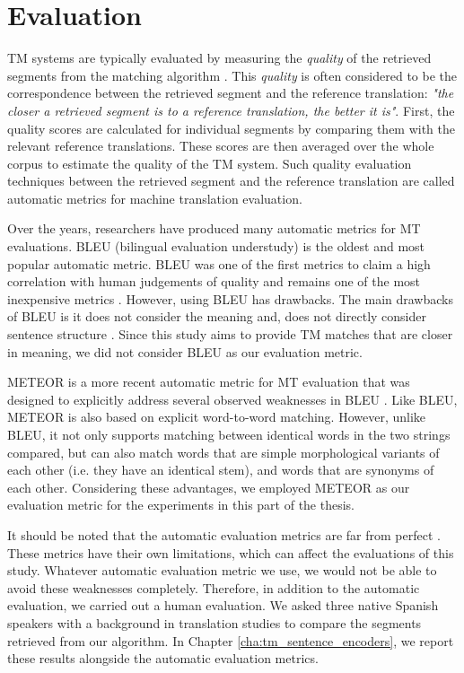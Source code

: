 \section{Evaluation}
\label{sec:tm_eval}
TM systems are typically evaluated by measuring the \textit{quality} of the retrieved segments from the matching algorithm \autocite{gupta-etal-2015-translation}. This \textit{quality} is often considered to be the correspondence between the retrieved segment and the reference translation: \textit{"the closer a retrieved segment is to a reference translation, the better it is"}. First, the quality scores are calculated for individual segments by comparing them with the relevant reference translations.  These scores are then averaged over the whole corpus to estimate the quality of the TM system. Such quality evaluation techniques between the retrieved segment and the reference translation are called automatic metrics for machine translation evaluation.

Over the years, researchers have produced many automatic metrics for MT evaluations. BLEU (bilingual evaluation understudy) \autocite{papineni-etal-2002-bleu} is the oldest and most popular automatic metric. BLEU was one of the first metrics to claim a high correlation with human judgements of quality and remains one of the most inexpensive metrics \autocite{gupta-etal-2015-machine}. However, using BLEU has drawbacks. The main drawbacks of BLEU is it does not consider the meaning and, does not directly consider sentence structure \autocite{sellam-etal-2020-bleurt}. Since this study aims to provide TM matches that are closer in meaning, we did not consider BLEU as our evaluation metric. 

METEOR is a more recent automatic metric for MT evaluation that was designed to explicitly address several observed weaknesses in BLEU \autocite{banerjee-lavie-2005-meteor}. Like BLEU, METEOR is also based on explicit word-to-word matching. However, unlike BLEU, it not only supports matching between identical words in the two strings compared, but can also match words that are simple morphological variants of each other (i.e. they have an identical stem), and words that are synonyms of each other. Considering these advantages, we employed METEOR as our evaluation metric for the experiments in this part of the thesis. 

It should be noted that the automatic evaluation metrics are far from perfect \autocite{sellam-etal-2020-bleurt}. These metrics have their own limitations, which can affect the evaluations of this study. Whatever automatic evaluation metric we use, we would not be able to avoid these weaknesses completely. Therefore, in addition to the automatic evaluation, we carried out a human evaluation. We asked three native Spanish speakers with a background in translation studies to compare the segments retrieved from our algorithm. In Chapter \ref{cha:tm_sentence_encoders}, we report these results alongside the automatic evaluation metrics.


